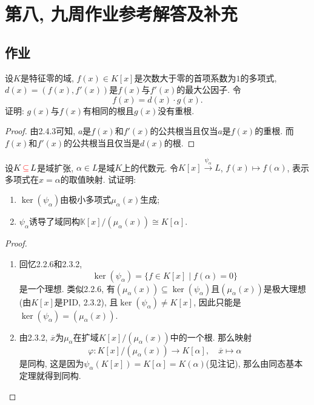 \documentclass{../solutions-cn}
\begin{document}
\section*{第八, 九周作业参考解答及补充}

\subsection*{作业}

\begin{exercise}[习题3.1.1]
    设$K$是特征零的域, $f(x) \in K[x]$是次数大于零的首项系数为$1$的多项式, $d(x) = (f(x), f'(x))$是$f(x)$与$f'(x)$的最大公因子. 令
    \[
        f(x) = d(x) \cdot g(x).
    \]
    证明: $g(x)$与$f(x)$有相同的根且$g(x)$没有重根.
\end{exercise}

\begin{proof}
    由2.4.3可知, $a$是$f(x)$和$f'(x)$的公共根当且仅当$a$是$f(x)$的重根. 而$f(x)$和$f'(x)$的公共根当且仅当是$d(x)$的根.
\end{proof}

\begin{exercise}[习题3.1.2]
    设$K \,\textcolor{red}{\subseteq}\, L$是域扩张, $\alpha \in L$是域$K$上的代数元. 令$K[x] \xrightarrow{\psi_{\alpha}}L$, $f(x) \mapsto f(\alpha)$, 表示多项式在$x = \alpha$的取值映射. 试证明:
    \begin{enumerate}[(1)]
        \item $\ker(\psi_\alpha)$由极小多项式$\mu_\alpha(x)$生成;
        \item $\psi_\alpha$诱导了域同构$\mathbb{K}[x]/(\mu_\alpha(x)) \cong K[\alpha]$.
    \end{enumerate}
\end{exercise}

\begin{proof}
    \begin{enumerate}[(1)]
        \item 回忆2.2.6和2.3.2,
        \[
            \ker(\psi_\alpha) = \{f \in K[x] \mid f(\alpha) = 0\}
        \]
        是一个理想. 类似2.2.6, 有$(\mu_\alpha(x)) \subseteq \ker(\psi_\alpha)$且$(\mu_\alpha(x))$是极大理想(由$K[x]$是PID, 2.3.2), 且$\ker(\psi_\alpha) \neq K[x]$, 因此只能是$\ker(\psi_\alpha) = (\mu_\alpha(x))$.
        \item 由2.3.2, $\overline{x}$为$\mu_\alpha$在扩域$K[x]/(\mu_\alpha(x))$中的一个根. 那么映射
        \[
            \varphi: K[x]/(\mu_\alpha(x)) \to K[\alpha],\quad \overline{x} \mapsto \alpha
        \]
        是同构, 这是因为$\psi_\alpha(K[x]) = K[\alpha] = K(\alpha)$(见注记), 那么由同态基本定理就得到同构.
    \end{enumerate}
\end{proof}
\end{document}

